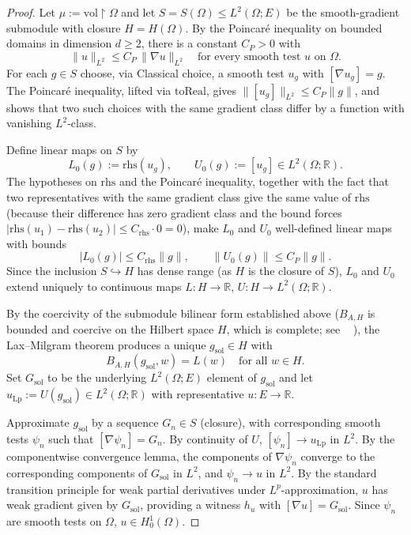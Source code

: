\documentclass[11pt]{amsart}
\newcommand{\R}{\mathbb{R}}
\newcommand{\Lp}[1]{L^{#1}}
\newcommand{\leanname}[1]{%
  \begingroup
  \textnormal{\small\texttt{%
    \let\oldunderscore\_%
    \def\_{\oldunderscore\discretionary{}{}{}}%
    \seqsplit{#1}}}%
  \endgroup}
\theoremstyle{definition}
\theoremstyle{remark}
\begin{document}
\begin{proof}
Let $\mu := \mathrm{vol}\!\restriction\!\Omega$ and let $S = S(\Omega) \leq \Lp{2}(\Omega; E)$ be the smooth-gradient submodule with closure $H = H(\Omega)$. By the Poincar\'e inequality on bounded domains in dimension $d \geq 2$, there is a constant $C_P > 0$ with
\[
  \|u\|_{\Lp{2}} \leq C_P\,\|\nabla u\|_{\Lp{2}} \quad \text{for every smooth test } u \text{ on } \Omega.
\]
For each $g \in S$ choose, via Classical choice, a smooth test $u_g$ with $[\nabla u_g] = g$. The Poincar\'e inequality, lifted via $\mathrm{toReal}$, gives $\|[u_g]\|_{\Lp{2}} \leq C_P \|g\|$, and shows that two such choices with the same gradient class differ by a function with vanishing $\Lp{2}$-class.

Define linear maps on $S$ by
\[
  L_0(g) := \mathrm{rhs}(u_g), \qquad U_0(g) := [u_g] \in \Lp{2}(\Omega; \R).
\]
The hypotheses on $\mathrm{rhs}$ and the Poincar\'e inequality, together with the fact that two representatives with the same gradient class give the same value of $\mathrm{rhs}$ (because their difference has zero gradient class and the bound forces $|\mathrm{rhs}(u_1) - \mathrm{rhs}(u_2)| \leq C_{\mathrm{rhs}} \cdot 0 = 0$), make $L_0$ and $U_0$ well-defined linear maps with bounds
\[
  |L_0(g)| \leq C_{\mathrm{rhs}}\|g\|, \qquad \|U_0(g)\| \leq C_P\|g\|.
\]
Since the inclusion $S \hookrightarrow H$ has dense range (as $H$ is the closure of $S$), $L_0$ and $U_0$ extend uniquely to continuous maps $L : H \to \R$, $U : H \to \Lp{2}(\Omega;\R)$.

By the coercivity of the submodule bilinear form established above ($B_{A,H}$ is bounded and coercive on the Hilbert space $H$, which is complete; see \leanname{coeffBilinSubmodule\_coercive}), the Lax--Milgram theorem produces a unique $g_{\mathrm{sol}} \in H$ with
\[
  B_{A,H}(g_{\mathrm{sol}}, w) = L(w) \quad \text{for all } w \in H.
\]
Set $G_{\mathrm{sol}}$ to be the underlying $\Lp{2}(\Omega;E)$ element of $g_{\mathrm{sol}}$ and let $u_{\mathrm{Lp}} := U(g_{\mathrm{sol}}) \in \Lp{2}(\Omega;\R)$ with representative $u : E \to \R$.

Approximate $g_{\mathrm{sol}}$ by a sequence $G_n \in S$ (closure), with corresponding smooth tests $\psi_n$ such that $[\nabla \psi_n] = G_n$. By continuity of $U$, $[\psi_n] \to u_{\mathrm{Lp}}$ in $\Lp{2}$. By the componentwise convergence lemma, the components of $\nabla \psi_n$ converge to the corresponding components of $G_{\mathrm{sol}}$ in $\Lp{2}$, and $\psi_n \to u$ in $\Lp{2}$. By the standard transition principle for weak partial derivatives under $\Lp{p}$-approximation, $u$ has weak gradient given by $G_{\mathrm{sol}}$, providing a witness $h_u$ with $[\nabla u] = G_{\mathrm{sol}}$. Since $\psi_n$ are smooth tests on $\Omega$, $u \in H^{1}_{0}(\Omega)$.


\end{proof}
\end{document}
